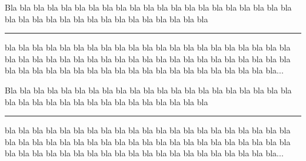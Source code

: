 \documentclass[12pt]{article}
\newif\ifincomplet
\begin{document}
\begin{acompleter} 
    Bla bla bla bla bla bla bla bla bla bla bla bla bla bla bla bla bla bla     
    bla bla bla bla bla bla bla bla bla bla bla bla bla bla bla bla bla bla 


    \rule{3cm}{3.5cm}
    
    
    bla bla bla bla bla bla bla bla bla bla bla bla bla bla bla bla bla bla 
    bla bla bla bla bla bla bla bla bla bla bla bla bla bla bla bla bla bla 
    bla bla bla bla bla bla bla bla bla bla bla bla bla bla bla bla bla bla 
    bla bla bla bla bla bla bla bla... 
\end{acompleter} 


\incomplettrue


\begin{acompleter} 
    Bla bla bla bla bla bla bla bla bla bla bla bla bla bla bla bla bla bla     
    bla bla bla bla bla bla bla bla bla bla bla bla bla bla bla bla bla bla 


    \rule{3cm}{3.5cm}
    
    
    bla bla bla bla bla bla bla bla bla bla bla bla bla bla bla bla bla bla 
    bla bla bla bla bla bla bla bla bla bla bla bla bla bla bla bla bla bla 
    bla bla bla bla bla bla bla bla bla bla bla bla bla bla bla bla bla bla 
    bla bla bla bla bla bla bla bla... 
\end{acompleter} 
\end{document}
